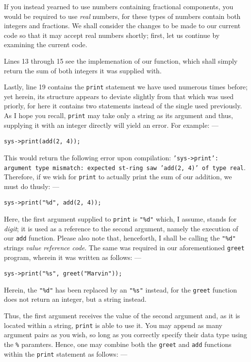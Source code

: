 \documentclass[a5paper,twoside,12pt]{report}
\begin{document}
If you instead yearned to use numbers containing fractional components, you would be required to use \textit{real} numbers, for these types of numbers contain both integers and fractions. We shall consider the changes to be made to our current code so that it may accept real numbers shortly; first, let us continue by examining the current code.

Lines 13 through 15 see the implemenation of our function, which shall simply return the sum of both integers it was supplied with.

Lastly, line 19 contains the \texttt{print} statement we have used numerous times before; yet herein, its structure appears to deviate slightly from that which was used priorly, for here it contains two statements instead of the single used previously. As I hope you recall, \texttt{print} may take only a string as its argument and thus, supplying it with an integer directly will yield an error. For example: —

\begin{lstlisting}
sys->print(add(2, 4));
\end{lstlisting}

This would return the following error upon compilation: \texttt{'sys->print': argument type mismatch: expected st-\allowbreak ring saw 'add(2, 4)' of type real}. Therefore, if we wish for \texttt{print} to actually print the sum of our addition, we must do thusly: —

\begin{lstlisting}
sys->print("%d", add(2, 4));
\end{lstlisting}

Here, the first argument supplied to \texttt{print} is \texttt{"\%d"} which, I assume, stands for \textit{digit}; it is used as a reference to the second argument, namely the execution of our \texttt{add} function. Please also note that, henceforth, I shall be calling the \texttt{"\%d"} strings \textit{value reference code}. The same was required in our aforementioned \texttt{greet} program, wherein it was written as follows: —

\begin{lstlisting}
sys->print("%s", greet("Marvin"));
\end{lstlisting}

Herein, the \texttt{"\%d"} has been replaced by an \texttt{"\%s"} instead, for the \texttt{greet} function does not return an integer, but a string instead. 

Thus, the first argument receives the value of the second argument and, as it is located within a string, \texttt{print} is able to use it. You may append as many argument pairs as you wish, so long as you correctly specify their data type using the \texttt{\%} paramters. Hence, one may combine both the \texttt{greet} and \texttt{add} functions within the \texttt{print} statement as follows: —
\end{document}
